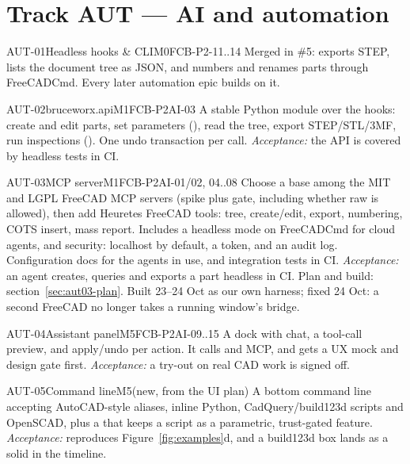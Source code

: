 \section{Track AUT --- AI and automation}\label{sec:aut}

\begin{epic}{AUT-01}{Headless hooks \& CLI}{M0}{\stDone}{FCB-P2-11..14}
Merged in \#5:  exports STEP, lists the document tree as JSON, and
numbers and renames parts through FreeCADCmd. Every later automation epic builds on it.
\end{epic}

\begin{epic}{AUT-02}{bruceworx.api}{M1}{\stTodo}{FCB-P2AI-03}
A stable Python module over the hooks: create and edit parts, set parameters (), read the tree,
export STEP/STL/3MF, run inspections (). One undo transaction per call.
\emph{Acceptance:} the API is covered by headless tests in CI.
\end{epic}

\begin{epic}{AUT-03}{MCP server}{M1}{\stProg}{FCB-P2AI-01/02, 04..08}
Choose a base among the MIT and LGPL FreeCAD MCP servers (spike plus gate, including whether raw
 is allowed), then add Heuretes FreeCAD tools: tree, create/edit, export, numbering, COTS
insert, mass report. Includes a headless mode on FreeCADCmd for cloud agents, and security: localhost by
default, a token, and an audit log. Configuration docs for the agents in use, and integration tests in CI.
\emph{Acceptance:} an agent creates, queries and exports a part headless in CI.
Plan and build: section~\ref{sec:aut03-plan}. Built 23--24 Oct as our own harness; fixed 24 Oct: a second FreeCAD
no longer takes a running window's bridge.
\end{epic}



\begin{epic}{AUT-04}{Assistant panel}{M5}{\stTodo}{FCB-P2AI-09..15}
A dock with chat, a tool-call preview, and apply/undo per action. It calls  and MCP, and
gets a UX mock and design gate first.
\emph{Acceptance:} a try-out on real CAD work is signed off.
\end{epic}

\begin{epic}{AUT-05}{Command line}{M5}{\stTodo}{(new, from the UI plan)}
A bottom command line accepting AutoCAD-style aliases, inline Python, CadQuery/build123d scripts and
OpenSCAD, plus a  that keeps a script as a parametric, trust-gated feature.
\emph{Acceptance:}  reproduces Figure~\ref{fig:examples}d, and a build123d box lands
as a solid in the timeline.
\end{epic}

